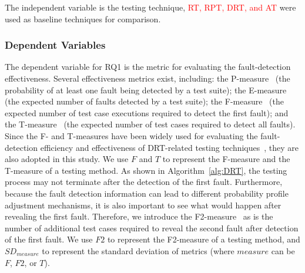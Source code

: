 \documentclass[10pt,journal,compsoc]{IEEEtran}
\begin{document}
The independent variable is the testing technique, \textcolor{red}{RT, RPT, DRT, and AT \cite{cai2004optimal}} were used as baseline techniques for comparison.

\subsubsection{Dependent Variables}
\label{sec:dependentvariables}

The dependent variable for RQ1 is the metric for evaluating the fault-detection effectiveness.
Several effectiveness metrics exist, including:
the P-measure~\cite{duran1984evaluation} (the probability of at least one fault being detected by a test suite);
the E-measure~\cite{chen1997optimal} (the expected number of faults detected by a test suite);
the F-measure~\cite{sun2018adaptive} (the expected number of test case executions required to detect the first fault); and
the T-measure~\cite{zhang2014history} (the expected number of test cases required to detect all faults).
Since the F- and T-measures have been widely used for evaluating the fault-detection efficiency and effectiveness of DRT-related testing techniques~\cite{Cai07, cai2009random, Lv2011, Yang2014Dynamic, li2015, zhang2014history}, they are also adopted in this study.
We use $F$ and $T$ to represent the F-measure and the T-measure of a testing method.
As shown in Algorithm~\ref{alg:DRT}, the testing process may not terminate after the detection of the first fault.
Furthermore, because the fault detection information can lead to different probability profile adjustment mechanisms, it is also important to see what would happen after revealing the first fault.
Therefore, we introduce the F2-measure~\cite{sun2018adaptive} as is the number of additional test cases required to reveal the second fault after detection of the first fault.
We use $F2$ to represent the F2-measure of a testing method, and $SD_{measure}$ to represent the standard deviation of metrics (where $measure$ can be $F$, $F2$, or $T$).
\end{document}
